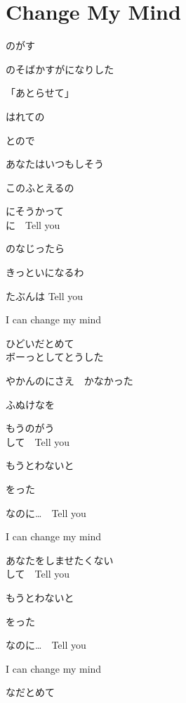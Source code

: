 \section{ Change My Mind}
\large{

のがす

のそばかすがになりした

「あとらせて」

はれての

とので

あなたはいつもしそう

このふとえるの

にそうかって
\\

に　Tell you

のなじったら

きっといになるわ

たぶんは Tell you

I can change my mind

ひどいだとめて
\\

ボーっとしてとうした

やかんのにさえ　かなかった

ふぬけなを

もうのがう
\\

して　Tell you

もうとわないと

をった

なのに…　Tell you

I can change my mind

あなたをしませたくない
\\

して　Tell you

もうとわないと

をった

なのに…　Tell you

I can change my mind

なだとめて

}